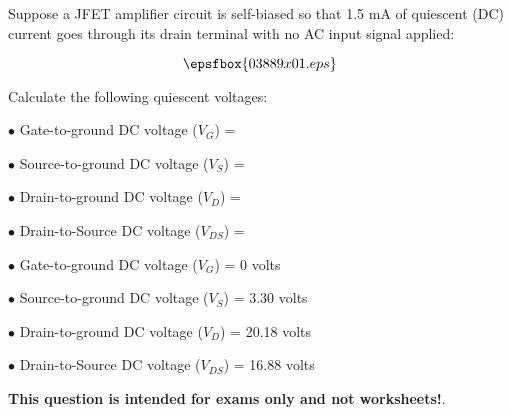 

Suppose a JFET amplifier circuit is self-biased so that 1.5 mA of quiescent (DC) current goes through its drain terminal with no AC input signal applied:

$$\epsfbox{03889x01.eps}$$

Calculate the following quiescent voltages:

\medskip
\item{$\bullet$} Gate-to-ground DC voltage ($V_G$) = 
\item{$\bullet$} Source-to-ground DC voltage ($V_S$) =
\item{$\bullet$} Drain-to-ground DC voltage ($V_D$) =
\item{$\bullet$} Drain-to-Source DC voltage ($V_{DS}$) =
\medskip







\medskip
\item{$\bullet$} Gate-to-ground DC voltage ($V_G$) = 0 volts
\item{$\bullet$} Source-to-ground DC voltage ($V_S$) = 3.30 volts
\item{$\bullet$} Drain-to-ground DC voltage ($V_D$) = 20.18 volts
\item{$\bullet$} Drain-to-Source DC voltage ($V_{DS}$) = 16.88 volts
\medskip







{\bf This question is intended for exams only and not worksheets!}.



